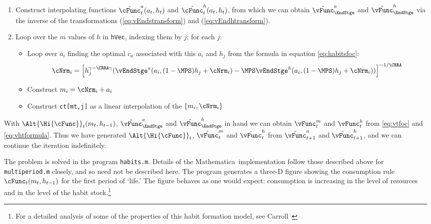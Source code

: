 \documentclass[\econtexRoot/SolvingMicroDSOPs]{subfiles}
\begin{document}
\begin{enumerate}
\item Construct interpolating functions $\hat{\cFunc}^{a}_{t}({a}_{t},h_{t})$
  and $\hat{\cFunc }^{h}_{t}({a}_{t},h_{t})$, from which we can
  obtain $\hat{\vFunc}_{\EndStge}^{a}$ and $\hat{\vFunc}_{\EndStge}^{h}$
  via the inverse of the transformations (\ref{eq:vEndstransform})
  and (\ref{eq:vEndhtransform}).

\item Loop over the $m$ values of $h$ in \texttt{hVec}, indexing them
  by $j$; for each $j$:
  \begin{itemize}
  \item Loop over ${a}_{i}$ finding the optimal ${c}_{a}$ associated
    with this ${a}_{i}$ and $h_{j}$ from the formula in equation
    \eqref{eq:habitsfoc}:
    \begin{equation}
      {\cNrm}_{i} = \left[h_{j}^{\gamma-\CRRA \gamma}
        (\vEndStge^{{a}}({a}_{i},(1-\MPS) h_{j}+ {\cNrm}_{i})
        -\MPS \vEndStge^{h}({a}_{i},(1-\MPS)
        h_{j}+{\cNrm}_{i}))\right]^{-1/\CRRA} \nonumber
    \end{equation}

  \item Construct ${m}_{i} = {\cNrm}_{i}+{a}_{i}$

  \item Construct \texttt{ct[mt,j]} as a linear interpolation of the
    $\{{m}_{i},{\cNrm}_{i}\}$
  \end{itemize}
\end{enumerate}

With $\Alt{\Hi{\cFunc}}_{t}({m}_{t},h_{t-1})$, $\hat{\vFunc}_{\EndStge}^{{a}}$
and $\hat{\vFunc}_{\EndStge}^{h}$ in hand we can obtain ${\vFunc}^{m}_{t}$
and ${\vFunc}^{h}_{t}$ from \eqref{eq:vtfoc} and
\eqref{eq:vhtformula}. Thus we have generated $\Alt{\Hi{\cFunc}}_{t}$,
$\hat{\vFunc}^{m}_{t}$ and $\hat{\vFunc}^{h}_{t}$ from $\hat{\vFunc}^{a}_{t+1}$ and
$\hat{\vFunc}^{h}_{t+1}$, and we can continue the iteration indefinitely.

The problem is solved in the program \texttt{habits.m}.  Details of
the {Mathematica}~implementation follow those described above for
\texttt{multiperiod.m} closely, and so need not be described here.
The program generates a three-D figure showing the consumption rule
$\cFunc_{t}({m}_{t},h_{t-1})$ for the first period of `life.'  The figure
behaves as one would expect: consumption is increasing in the level
of resources and in the level of the habit stock.\footnote{For a
  detailed analysis of some of the properties of this habit formation
  model, see Carroll~\citeyearpar{carroll:RiskyHabits}}


\end{document}
